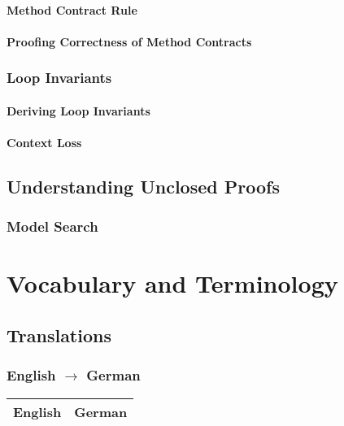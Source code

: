 \documentclass[a4paper, 11pt, accentcolor = tud3b]{tudreport}
\begin{document}
				\subsubsection{Method Contract Rule} %

				\subsubsection{Proofing Correctness of Method Contracts} %

			\subsection{Loop Invariants} %

				\subsubsection{Deriving Loop Invariants} %

				\subsubsection{Context Loss} %

		\section{Understanding Unclosed Proofs} %

			\subsection{Model Search} %
	
	
	\appendix
	
	\chapter{Vocabulary and Terminology}
		\section{Translations}
			\subsection{English \(\to\) German}
				\begin{table}[H]
					\centering
					\begin{tabular}{l|l}
						\textbf{English} & \textbf{German} \\ \hline
						
					\end{tabular}
				\end{table}
			
\end{document}
